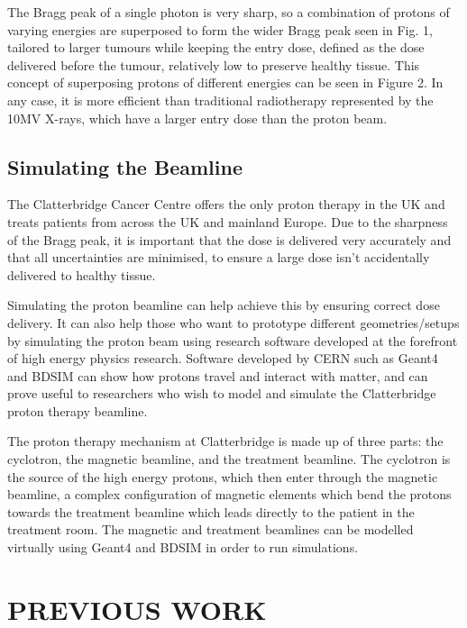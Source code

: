 \documentclass[a4paper, 12pt, conference]
{ieeeconf}      %
\begin{document}
The Bragg peak of a single photon is very sharp, so a combination of protons of varying energies are superposed to form the wider Bragg peak seen in Fig. 1, tailored to larger tumours while keeping the entry dose, defined as the dose delivered before the tumour, relatively low to preserve healthy tissue. This concept of superposing protons of different energies can be seen in Figure 2. In any case, it is more efficient than traditional radiotherapy represented by the 10MV X-rays, which have a larger entry dose than the proton beam.



\subsection{Simulating the Beamline}

The Clatterbridge Cancer Centre offers the only proton therapy in the UK and treats patients from across the UK and mainland Europe. Due to the sharpness of the Bragg peak, it is important that the dose is delivered very accurately and that all uncertainties are minimised, to ensure a large dose isn't accidentally delivered to healthy tissue. 

Simulating the proton beamline can help achieve this by ensuring correct dose delivery. It can also help those who want to prototype different geometries/setups by simulating the proton beam using research software developed at the forefront of high energy physics research. Software developed by CERN such as Geant4 and BDSIM can show how protons travel and interact with matter, and can prove useful to researchers who wish to model and simulate the Clatterbridge proton therapy beamline.


The proton therapy mechanism at Clatterbridge is made up of three parts: the cyclotron, the magnetic beamline, and the treatment beamline. The cyclotron is the source of the high energy protons, which then enter through the magnetic beamline, a complex configuration of magnetic elements which bend the protons towards the treatment beamline which leads directly to the patient in the treatment room. The magnetic and treatment beamlines can be modelled virtually using Geant4 and BDSIM in order to run simulations.


\section{PREVIOUS WORK}
\end{document}
